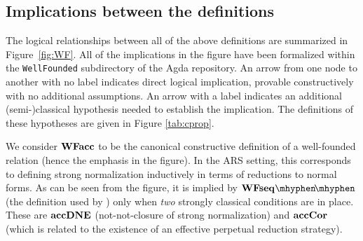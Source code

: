 \subsection{Implications between the definitions}

The logical relationships between all of the above definitions are summarized in Figure~\ref{fig:WF}.
All of the implications in the figure have been
formalized within the \texttt{WellFounded} subdirectory of the Agda repository.
An arrow from one node to another with no label indicates direct logical implication,
provable constructively with no additional assumptions. An arrow with a label indicates an additional
(semi-)classical hypothesis needed to establish the implication.
The definitions of these hypotheses are given in Figure \ref{tab:cprop}.

We consider $\mathbf{WFacc}$ to be the canonical constructive definition of
a well-founded relation (hence the emphasis in the figure).
In the ARS setting, this corresponds to defining
strong normalization inductively in terms of reductions to normal forms.
As can be seen from the figure, it is implied by
$\WFseqm$ (the definition used by \terese) only when \emph{two}
strongly classical conditions are in place.
These are $\mathbf{accDNE}$ (not-not-closure of strong normalization)
and $\mathbf{accCor}$ (which is related to the existence of an effective perpetual reduction strategy).










